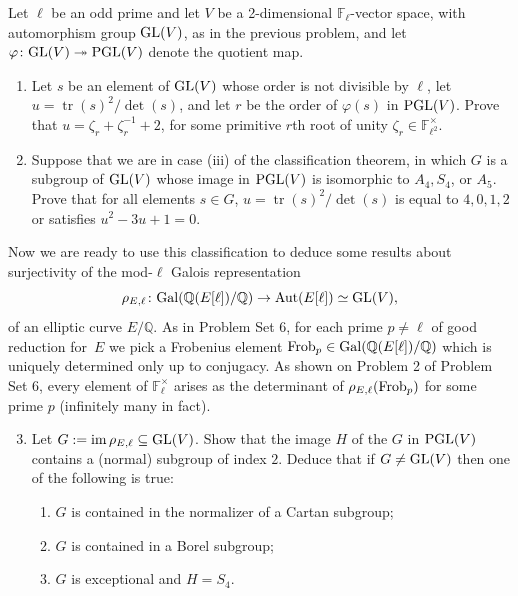 \documentclass[11pt]{article}
\newcommand{\F}{\mathbb{F}}
\newcommand{\Q}{\mathbb{Q}}
\newcommand{\Aut}{{\rm Aut}}
\newcommand{\Gal}{{\rm Gal}}
\newcommand{\GL}{{\rm GL}}
\newcommand{\PGL}{{\rm PGL}}
\newcommand{\tr}{\operatorname{tr}}
\newcommand{\im}{\operatorname{im}}
\newcommand{\Frob}{{\rm Frob}}
\begin{document}
Let $\ell$ be an odd prime and let $V$ be a 2-dimensional $\F_\ell$-vector space, with automorphism group $\GL(V)$, as in the previous problem, and let $\varphi\colon \GL(V)\twoheadrightarrow\PGL(V)$ denote the quotient map.

\begin{enumerate}[{\bf(a)}]
\item Let $s$ be an element of $\GL(V)$ whose order is not divisible by $\ell$, let $u=\tr(s)^2/\det(s)$, and let $r$ be the order of $\varphi(s)$ in $\PGL(V)$.
Prove that $u = \zeta_r + \zeta_r^{-1} + 2$, for some primitive $r$th root of unity $\zeta_r\in\F_{\ell^2}^\times$.
\item Suppose that we are in case (iii) of the classification theorem, in which $G$ is a subgroup of $\GL(V)$ whose image in $\PGL(V)$ is isomorphic to $A_4, S_4$, or $A_5$.
Prove that for all elements $s \in G$, $u = \tr(s)^2/\det(s)$ is equal to $4, 0, 1, 2$ or satisfies $u^2 - 3u+1 = 0$.  
\end{enumerate}

Now we are ready to use this classification to deduce some results about surjectivity of the mod-$\ell$ Galois representation
\[
\rho_{E,\ell} \colon \Gal(\Q(E[\ell])/\Q) \to \Aut(E[\ell]) \simeq \GL(V),
\]
of an elliptic curve $E/\Q$.  As in Problem Set 6, for each prime $p\ne \ell$ of good reduction for~$E$ we pick a Frobenius element $\Frob_p\in \Gal(\Q(E[\ell])/\Q)$ which is uniquely determined only up to conjugacy. As shown on Problem 2 of Problem Set 6, every element of $\F_\ell^\times$ arises as the determinant of $\rho_{E,\ell}(\Frob_p)$ for some prime $p$ (infinitely many in fact).


\begin{enumerate}[{\bf(a)}]
\setcounter{enumi}{2}


\item Let $G := \im \rho_{E, \ell}\subseteq \GL(V)$.  Show that the image $H$ of the $G$ in $\PGL(V)$ contains a (normal) subgroup of index $2$.
Deduce that if $G \neq \GL(V)$ then one of the following is true:
\begin{enumerate}[1.]
\setlength{\itemsep}{0pt}
\item $G$ is contained in the normalizer of a Cartan subgroup;
\item $G$ is contained in a Borel subgroup;
\item $G$ is exceptional and $H = S_4$.
\end{enumerate}
\end{enumerate}
\end{document}
